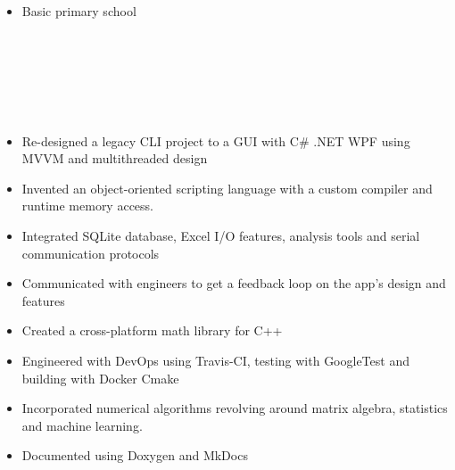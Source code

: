 \documentclass[11pt,a4paper,ragged2e]{altacv}
\begin{document}
\begin{paracol}{2}
\divider
{}
\begin{itemize}
\item Basic primary school
\end{itemize}

 \\
\vspace{0.5mm}
 \\
\vspace{0.5mm}
 \\
\divider \\
\\
\vspace{0.5mm}
 \smallskip

\divider
{}




\switchcolumn
\newpage
{}

\begin{itemize}
\item Re-designed a legacy CLI project to a GUI with C\# .NET WPF using MVVM and multithreaded design
\item Invented an object-oriented scripting language with a custom compiler and runtime memory access.
\item Integrated SQLite database, Excel I/O features, analysis tools and serial communication protocols 
\item Communicated with engineers to get a feedback loop on the app's design and features
\end{itemize}

\divider
{}
\begin{itemize}
\item Created a cross-platform math library for C++ 
\item Engineered with DevOps using Travis-CI, testing with GoogleTest and building with Docker Cmake
\item Incorporated numerical algorithms revolving around matrix algebra, statistics and machine learning.
\item Documented using Doxygen and MkDocs
\end{itemize}
\divider



\end{paracol}
\end{document}
